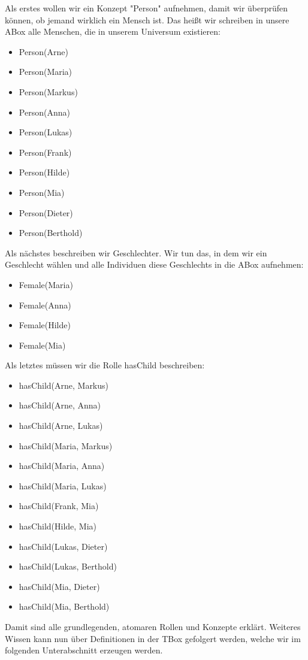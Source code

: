 \documentclass[runningheads,a4paper]{llncs}
\begin{document}
Als erstes wollen wir ein Konzept "Person" aufnehmen, damit wir überprüfen können, ob jemand wirklich ein Mensch ist. Das heißt wir schreiben in unsere ABox alle Menschen, die in unserem Universum existieren:
	\begin{itemize}
	\item[] Person(Arne)
	\item[] Person(Maria)
	\item[] Person(Markus)
	\item[] Person(Anna)
	\item[] Person(Lukas)
	\item[] Person(Frank)
	\item[] Person(Hilde)
	\item[] Person(Mia)
	\item[] Person(Dieter)
	\item[] Person(Berthold)
	\end{itemize}
Als nächstes beschreiben wir Geschlechter. Wir tun das, in dem wir ein Geschlecht wählen und alle Individuen diese Geschlechts in die ABox aufnehmen:
	\begin{itemize}
	\item[] Female(Maria)
	\item[] Female(Anna)
	\item[] Female(Hilde)
	\item[] Female(Mia)
	\end{itemize}
Als letztes müssen wir die Rolle hasChild beschreiben:
	\begin{itemize}
	\item[] hasChild(Arne, Markus)
	\item[] hasChild(Arne, Anna)
	\item[] hasChild(Arne, Lukas)
	\item[] hasChild(Maria, Markus)
	\item[] hasChild(Maria, Anna)
	\item[] hasChild(Maria, Lukas)
	\item[] hasChild(Frank, Mia)
	\item[] hasChild(Hilde, Mia)
	\item[] hasChild(Lukas, Dieter)
	\item[] hasChild(Lukas, Berthold)
	\item[] hasChild(Mia, Dieter)
	\item[] hasChild(Mia, Berthold)
	\end{itemize}

Damit sind alle grundlegenden, atomaren Rollen und Konzepte erklärt. Weiteres Wissen kann nun über Definitionen in der TBox gefolgert werden, welche wir im folgenden Unterabschnitt erzeugen werden. 
\end{document}
